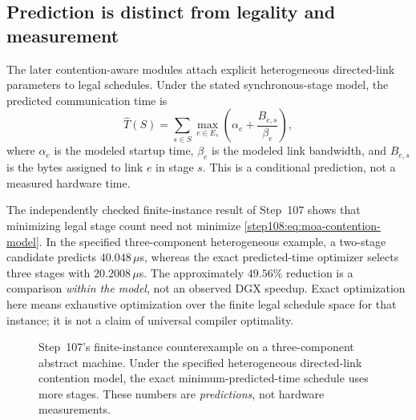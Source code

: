\documentclass[11pt]{article}
\begin{document}
\subsection{Prediction is distinct from legality and measurement}
\label{step108:subsec:moa-prediction-boundary}

The later contention-aware modules attach explicit heterogeneous directed-link
parameters to legal schedules.  Under the stated synchronous-stage model, the
predicted communication time is
\begin{equation}
  \widehat T(S)=\sum_{s\in S}
    \max_{e\in E_s}
    \left(\alpha_e+\frac{B_{e,s}}{\beta_e}\right),
  \label{step108:eq:moa-contention-model}
\end{equation}
where $\alpha_e$ is the modeled startup time, $\beta_e$ is the modeled link
bandwidth, and $B_{e,s}$ is the bytes assigned to link $e$ in stage $s$.
This is a conditional prediction, not a measured hardware time.

The independently checked finite-instance result of Step~107 shows that
minimizing legal stage count need not minimize
\eqref{step108:eq:moa-contention-model}.  In the specified three-component
heterogeneous example, a two-stage candidate predicts $40.048\,\mu$s,
whereas the exact predicted-time optimizer selects three stages with
$20.2008\,\mu$s.  The approximately $49.56\%$ reduction is a comparison
\emph{within the model}, not an observed DGX speedup.  Exact optimization here
means exhaustive optimization over the finite legal schedule space for that
instance; it is not a claim of universal compiler optimality.


\begin{figure}[t]
\centering
{}
\caption{Step~107's finite-instance counterexample on a three-component
abstract machine. Under the specified heterogeneous directed-link
contention model, the exact minimum-predicted-time schedule uses more
stages. These numbers are \emph{predictions}, not hardware measurements.}
\label{step108:fig:moa-scheduling-counterexample}
\end{figure}
\end{document}
